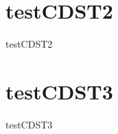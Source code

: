 \section{testCDST2}
\label{sec:dataSets:testCDST2}
\begin{dataSetDescription}{testCDST2}
\end{dataSetDescription}

\section{testCDST3}
\label{sec:dataSets:testCDST3}
\begin{dataSetDescription}{testCDST3}
\end{dataSetDescription}

